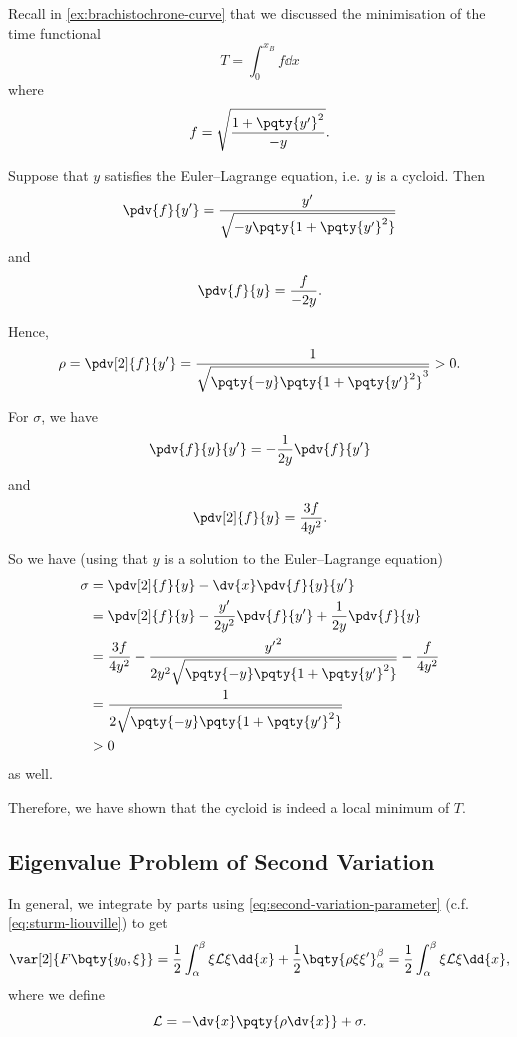 \begin{example}[Brachistochrone]
    Recall in \autoref{ex:brachistochrone-curve} that we discussed the minimisation of the time functional
    \[
        T = \int_{0}^{x_B} f \dd{x}
    \]
    where
    \[
        f = \sqrt{\frac{1 + \pqty{y'}^2}{-y}}.
    \]

    Suppose that \(y\) satisfies the Euler--Lagrange equation, i.e. \(y\) is a cycloid. Then
    \[
        \pdv{f}{y'} = \frac{y'}{\sqrt{-y \pqty{1 + \pqty{y'}^2}}}
    \]
    and
    \[
        \pdv{f}{y} = \frac{f}{-2y}.
    \]

    Hence,
    \[
        \rho = \pdv[2]{f}{{y'}} = \frac{1}{\sqrt{\pqty{-y} \pqty{1 + \pqty{y'}^2}^3}} > 0.
    \]

    For \(\sigma\), we have
    \[
        \pdv{f}{y}{y'} = -\frac{1}{2y} \pdv{f}{y'}
    \]
    and
    \[
        \pdv[2]{f}{y} = \frac{3f}{4y^2}.
    \]

    So we have (using that \(y\) is a solution to the Euler--Lagrange equation)
    \begin{align*}
        \sigma &= \pdv[2]{f}{y} - \dv{x} \pdv{f}{y}{y'} \\
        &= \pdv[2]{f}{y} - \frac{y'}{2 y^2} \pdv{f}{y'} + \frac{1}{2y} \pdv{f}{y} \\
        &= \frac{3f}{4 y^2} - \frac{{y'}^2}{2 y^2 \sqrt{\pqty{-y} \pqty{1 + \pqty{y'}^2}}} - \frac{f}{4y^2}\\
        &= \frac{1}{2 \sqrt{\pqty{-y} \pqty{1 + \pqty{y'}^2}}} \\
        &> 0
    \end{align*}
    as well.

    Therefore, we have shown that the cycloid is indeed a local minimum of \(T\).
\end{example}

\subsection{Eigenvalue Problem of Second Variation}

In general, we integrate by parts using \eqref{eq:second-variation-parameter} (c.f. \eqref{eq:sturm-liouville}) to get
\begin{equation}
    \label{eq:second-variation-sturm}%
    \var[2]{F\bqty{y_0, \xi}} = \frac{1}{2} \int_{\alpha}^{\beta} \xi \mathcal{L} \xi \dd{x} + \frac{1}{2} \bqty{\rho \xi \xi'}_{\alpha}^{\beta} = \frac{1}{2} \int_{\alpha}^{\beta} \xi \mathcal{L} \xi \dd{x},
\end{equation}
where we define
\[
    \mathcal{L} = - \dv{x}\pqty{\rho \dv{x}} + \sigma.
\]

